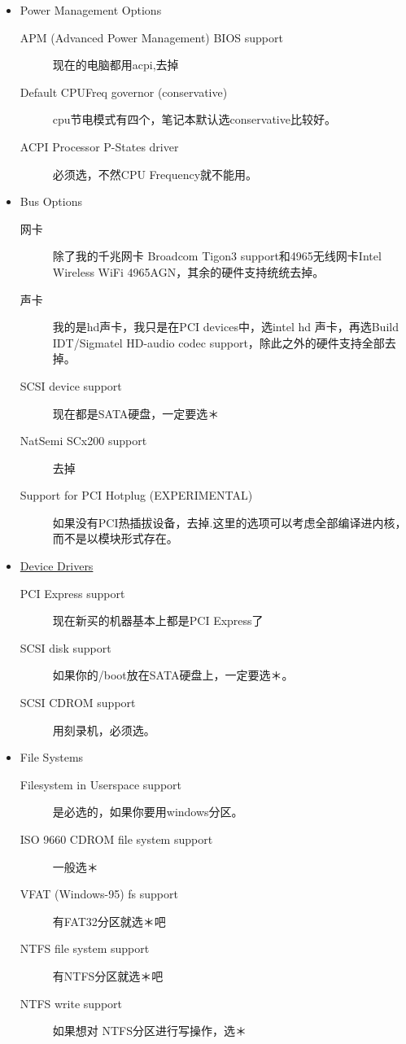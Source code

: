 \begin{itemize}
\item Power Management Options
\begin{description}
\item[APM (Advanced Power Management) BIOS support]	现在的电脑都用acpi,去掉

\item[Default CPUFreq governor (conservative)]	cpu节电模式有四个，笔记本默认选conservative比较好。

\item[ACPI Processor P-States driver]	必须选，不然CPU Frequency就不能用。
\end{description}


\item Bus Options
\begin{description}
\item[网卡]	除了我的千兆网卡 Broadcom Tigon3 support和4965无线网卡Intel Wireless WiFi 4965AGN，其余的硬件支持统统去掉。

\item[声卡]	我的是hd声卡，我只是在PCI devices中，选intel hd 声卡，再选Build IDT/Sigmatel HD-audio codec support，除此之外的硬件支持全部去掉。

\item[SCSI device support]	现在都是SATA硬盘，一定要选＊

\item[NatSemi SCx200 support]	去掉

\item[Support for PCI Hotplug (EXPERIMENTAL)]	如果没有PCI热插拔设备，去掉.这里的选项可以考虑全部编译进内核，而不是以模块形式存在。
\end{description}


\item \underline{Device Drivers}
\begin{description}
\item[PCI Express support]	现在新买的机器基本上都是PCI Express了

\item[SCSI disk support]		如果你的/boot放在SATA硬盘上，一定要选＊。

\item[SCSI CDROM support]	用刻录机，必须选。
\end{description}


\item File Systems
\begin{description}
\item[Filesystem in Userspace support]	是必选的，如果你要用windows分区。

\item[ISO 9660 CDROM file system support]	一般选＊

\item[VFAT (Windows-95) fs support]	 有FAT32分区就选＊吧

\item[NTFS file system support]	有NTFS分区就选＊吧

\item[NTFS write support]	如果想对 NTFS分区进行写操作，选＊
\end{description}
\end{itemize}



